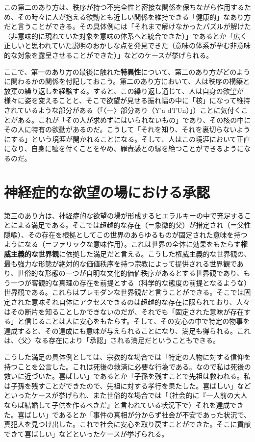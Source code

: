 \documentclass[8pt, a5paper]{ltjsarticle}
\begin{document}
この第二のあり方は、秩序が持つ不完全性と密接な関係を保ちながら作用するため、その時々に人が抱える欲動とも近しい関係を維持できる「健康的」なあり方だと言うことができる。その具体例には「それまで解けなかったパズルが解けた（非意味的に現れていた対象を意味の体系へと統合できた）」であるとか「広く正しいと思われていた説明のおかしな点を発見できた（意味の体系が孕む非意味的な対象を露呈させることができた）」などのケースが挙げられる。

ここで、第一のあり方の最後に触れた\textbf{特異性}について、第二のあり方がどのように関わるかの関係を付記しておこう。第二のあり方において、人は秩序の構築と放棄の繰り返しを経験する。すると、この繰り返し通じて、人は自身の欲望が様々に姿を変えることと、そこで欲望が見せる振れ幅の中に「核」になって維持されているような部分がある（「〈一〉部分あり（Y'a
d'l'Un）」）ことに気付くことがある。これが「その人が求めずにはいられないもの」であり、その核の中にその人に特有の欲動があるのだ。こうして「それを知り、それを裏切らないようにする」という境涯が開かれることになる。そして、人はこの境涯において正直になり、自身に嘘を付くことをやめ、罪責感との縁を絶つことができるようになるのだ。

\section{神経症的な欲望の場における承認}\label{ux795eux7d4cux75c7ux7684ux306aux6b32ux671bux306eux5834ux306bux304aux3051ux308bux627fux8a8d}

第三のあり方は、神経症的な欲望の場が形成するヒエラルキーの中で充足することによる満足である。そこでは超越的な存在（＝象徴的父）が措定され（＝父性隠喩）、その存在を根拠としてこの世界のあらゆるものが固定された意味を持つようになる（＝ファリックな意味作用）。これは世界の全体に効果をもたらす\textbf{権威主義的な世界観}に依拠した満足だと言える。こうした権威主義的な世界観の、最も強力な形態が絶対的な価値秩序を持つ宗教によって提供される世界観であり、世俗的な形態の一つが自明な文化的価値秩序があるとする世界観であり、もう一つが客観的な真理の存在を前提とする（科学的な態度の前提となるような）世界観である。これらはプレモダンな世界観だと言うことができる。そこでは固定された意味それ自体にアクセスできるのは超越的な存在に限られており、人々はその断片を知ることしかできないのだが、それでも「固定された意味が存在する」と信じることは人に安心をもたらす。そして、その安心の中で特定の物事を達成すると、その達成にも意味が与えられることになり、満足も得られる。これは、〈父〉なる存在により「承認」される満足だということもできる。

こうした満足の具体例としては、宗教的な場合では「特定の人物に対する信仰を持つことを公言した。これは死後の救済に必要な行為である。なので私は死後の救いに近づいた。喜ばしい」であるとか「子孫を残すことで先祖は救われる。私は子孫を残すことができたので、先祖に対する孝行を果たした。喜ばしい」などといったケースが挙げられ、また世俗的な場合では「（社会的に『一人前の大人ならば結婚して子供を作るべきだ』と言われている状況下で）それを達成できた。喜ばしい」であるとか「事件の真相が分からず社会が不安であった状況で、真犯人を見つけ出した。これで社会に安心を取り戻すことができた。そこに貢献できて喜ばしい」などといったケースが挙げられる。
\end{document}
